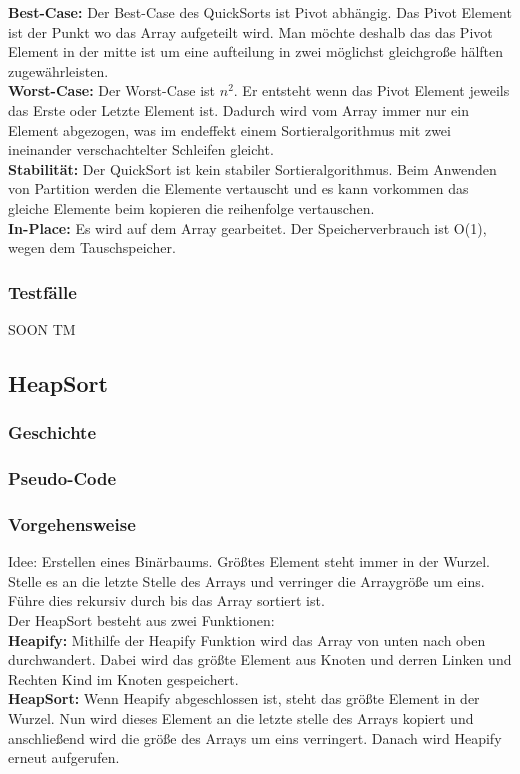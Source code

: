 \documentclass{article}
\begin{document}
\textbf{Best-Case:} Der Best-Case des QuickSorts ist Pivot abhängig. Das Pivot Element ist der Punkt wo das Array aufgeteilt wird. Man möchte deshalb das das Pivot Element in der mitte ist um eine aufteilung in zwei möglichst gleichgroße hälften zugewährleisten. \\
\textbf{Worst-Case:} Der Worst-Case ist  $n^{2}$. Er entsteht wenn das Pivot Element jeweils das Erste oder Letzte Element ist. Dadurch wird vom Array immer nur ein Element abgezogen, was im endeffekt einem Sortieralgorithmus mit zwei ineinander verschachtelter Schleifen gleicht. \\
\textbf{Stabilität:} Der QuickSort ist kein stabiler Sortieralgorithmus. Beim Anwenden von Partition werden die Elemente vertauscht und es kann vorkommen das gleiche Elemente beim kopieren die reihenfolge vertauschen. \\

\textbf{In-Place:} Es wird auf dem Array gearbeitet. Der Speicherverbrauch ist O(1), wegen dem Tauschspeicher.  \\
\subsubsection*{Testfälle}
SOON TM
\subsection{HeapSort}
\subsubsection*{Geschichte}
\subsubsection*{Pseudo-Code}
\subsubsection*{Vorgehensweise}
Idee: Erstellen eines Binärbaums. Größtes Element steht immer in der Wurzel. Stelle es an die letzte Stelle des Arrays und verringer die Arraygröße um eins. Führe dies rekursiv durch bis das Array sortiert ist.\\

Der HeapSort besteht aus zwei Funktionen:\\
\textbf{Heapify:} Mithilfe der Heapify Funktion wird das Array von unten nach oben durchwandert. Dabei wird das größte Element aus Knoten und derren Linken und Rechten Kind im Knoten gespeichert. \\
\textbf{HeapSort:} Wenn Heapify abgeschlossen ist, steht das größte Element in der Wurzel. Nun wird dieses Element an die letzte stelle des Arrays kopiert und anschließend wird die größe des Arrays um eins verringert. Danach wird Heapify erneut aufgerufen.\\
\end{document}
